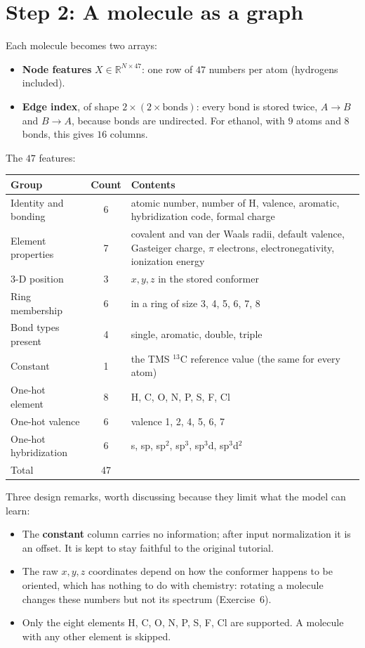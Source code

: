 \documentclass[11pt]{article}
\newcommand{\R}{\mathbb{R}}
\newcommand{\Cthirteen}{$^{13}$C}
\begin{document}
\section{Step 2: A molecule as a graph}
Each molecule becomes two arrays:
\begin{itemize}[nosep]
  \item \textbf{Node features} $X\in\R^{N\times47}$: one row of $47$ numbers per atom (hydrogens included).
  \item \textbf{Edge index}, of shape $2\times(2\times\text{bonds})$: every bond is stored twice, $A\to B$ and $B\to A$, because bonds are undirected. For ethanol, with $9$ atoms and $8$ bonds, this gives $16$ columns.
\end{itemize}

The $47$ features:

\begin{center}
\small
\begin{tabular}{@{}lcp{9.6cm}@{}}
\toprule
Group & Count & Contents\\
\midrule
Identity and bonding & 6 & atomic number, number of H, valence, aromatic, hybridization code, formal charge\\
Element properties & 7 & covalent and van der Waals radii, default valence, Gasteiger charge, $\pi$ electrons, electronegativity, ionization energy\\
3-D position & 3 & $x,y,z$ in the stored conformer\\
Ring membership & 6 & in a ring of size 3, 4, 5, 6, 7, 8\\
Bond types present & 4 & single, aromatic, double, triple\\
Constant & 1 & the TMS \Cthirteen{} reference value (the same for every atom)\\
One-hot element & 8 & H, C, O, N, P, S, F, Cl\\
One-hot valence & 6 & valence 1, 2, 4, 5, 6, 7\\
One-hot hybridization & 6 & s, sp, sp$^2$, sp$^3$, sp$^3$d, sp$^3$d$^2$\\
\midrule
Total & 47 & \\
\bottomrule
\end{tabular}
\end{center}

Three design remarks, worth discussing because they limit what the model can learn:
\begin{itemize}[nosep]
  \item The \textbf{constant} column carries no information; after input normalization it is an offset. It is kept to stay faithful to the original tutorial.
  \item The raw $x,y,z$ coordinates depend on how the conformer happens to be oriented, which has nothing to do with chemistry: rotating a molecule changes these numbers but not its spectrum (Exercise~6).
  \item Only the eight elements H, C, O, N, P, S, F, Cl are supported. A molecule with any other element is skipped.
\end{itemize}
\end{document}
